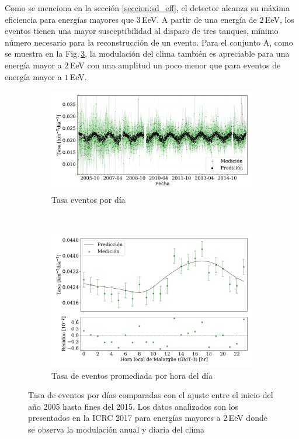         Como se menciona en la sección \ref{seccion:sd_eff}, el detector alcanza su máxima eficiencia para energías mayores que 3\,EeV. A partir de una energía de $2\,$EeV, los eventos tienen una mayor susceptibilidad al disparo de tres tanques, mínimo número necesario para la reconstrucción de un evento. Para el conjunto A, como se muestra en la Fig.\,\ref{fig:rate_2017_05-15_2EeV}, la modulación del clima también es apreciable para una energía mayor a $2\,$EeV con una amplitud un  poco menor que para eventos de energía mayor a $1\,$EeV. 

        \begin{figure}[H]
            \centering
            \begin{subfigure}[b]{0.875\textwidth}
            \includegraphics[width=\textwidth]{Graphs/rate_dayly/herald_old_above_2EeV_rate_day.pdf}
            \caption{Tasa eventos por día}\label{fig:rate_dayly_ICRC_2017_2EeV}
            \end{subfigure}\\
            \begin{subfigure}[b]{0.875\textwidth}
            \includegraphics[width=\textwidth]{Graphs/rate_hour_of_the_day/herald_old_above_2EeV_hour_of_the_day.pdf}
            \caption{Tasa de eventos promediada por hora del día }\label{fig:rate_hod_ICRC_2017_2EeV}
            \end{subfigure}%
            \caption{Tasa de eventos por días comparadas con el ajuste entre el inicio del año 2005 hasta fines del 2015. Los datos analizados son los presentados en la ICRC 2017 para energías mayores a $2\,$EeV donde se observa la modulación anual y diaria del clima }\label{fig:rate_2017_05-15_2EeV}
        \end{figure}

